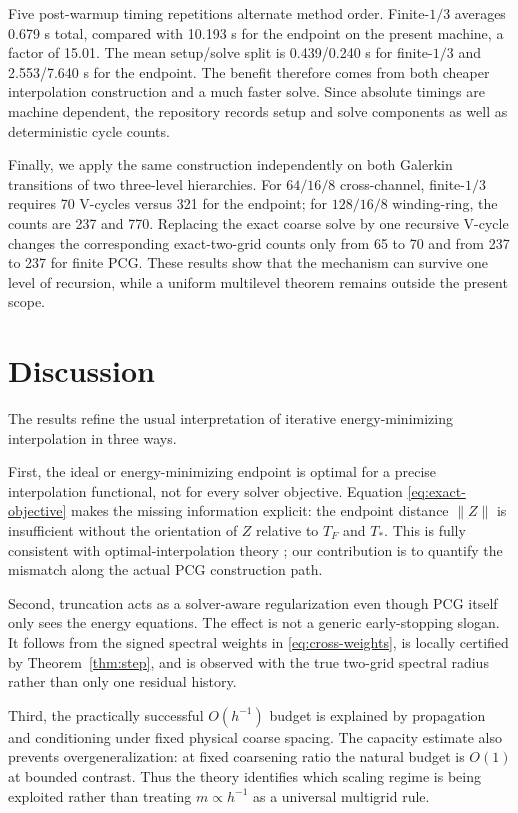 \documentclass[smallextended]{svjour3}
\newcommand{\norm}[1]{\lVert#1\rVert}
\begin{document}
Five post-warmup timing repetitions alternate method order. Finite-$1/3$ averages 0.679 s total, compared with 10.193 s for the endpoint on the present machine, a factor of 15.01. The mean setup/solve split is 0.439/0.240 s for finite-$1/3$ and 2.553/7.640 s for the endpoint. The benefit therefore comes from both cheaper interpolation construction and a much faster solve. Since absolute timings are machine dependent, the repository records setup and solve components as well as deterministic cycle counts.

Finally, we apply the same construction independently on both Galerkin transitions of two three-level hierarchies. For $64/16/8$ cross-channel, finite-$1/3$ requires 70 V-cycles versus 321 for the endpoint; for $128/16/8$ winding-ring, the counts are 237 and 770. Replacing the exact coarse solve by one recursive V-cycle changes the corresponding exact-two-grid counts only from 65 to 70 and from 237 to 237 for finite PCG. These results show that the mechanism can survive one level of recursion, while a uniform multilevel theorem remains outside the present scope.

\section{Discussion}\label{sec:discussion}
The results refine the usual interpretation of iterative energy-minimizing interpolation in three ways.

First, the ideal or energy-minimizing endpoint is optimal for a precise interpolation functional, not for every solver objective. Equation \eqref{eq:exact-objective} makes the missing information explicit: the endpoint distance $\norm Z$ is insufficient without the orientation of $Z$ relative to $T_F$ and $T_*$. This is fully consistent with optimal-interpolation theory \cite{brannick2018optimal}; our contribution is to quantify the mismatch along the actual PCG construction path.

Second, truncation acts as a solver-aware regularization even though PCG itself only sees the energy equations. The effect is not a generic early-stopping slogan. It follows from the signed spectral weights in \eqref{eq:cross-weights}, is locally certified by Theorem~\ref{thm:step}, and is observed with the true two-grid spectral radius rather than only one residual history.

Third, the practically successful $O(h^{-1})$ budget is explained by propagation and conditioning under fixed physical coarse spacing. The capacity estimate also prevents overgeneralization: at fixed coarsening ratio the natural budget is $O(1)$ at bounded contrast. Thus the theory identifies which scaling regime is being exploited rather than treating $m\propto h^{-1}$ as a universal multigrid rule.
\end{document}
